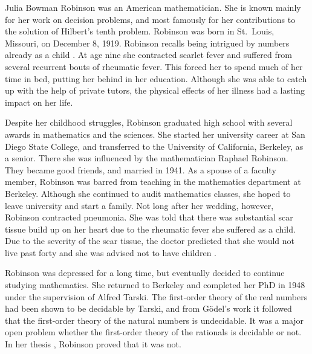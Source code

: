 \documentclass[../../../include/open-logic-section]{subfiles}
\begin{document}


Julia Bowman Robinson was an American mathematician. She is known
mainly for her work on decision problems, and most famously for her
contributions to the solution of Hilbert's tenth problem. Robinson was
born in St.~Louis, Missouri, on December 8, 1919. Robinson recalls
being intrigued by numbers already as a child \cite[4]{Reid1986}.
At age nine she contracted scarlet fever and suffered from several
recurrent bouts of rheumatic fever. This forced her to spend much of
her time in bed, putting her behind in her education.  Although she
was able to catch up with the help of private tutors, the physical
effects of her illness had a lasting impact on her life.

Despite her childhood struggles, Robinson graduated high school with
several awards in mathematics and the sciences. She started her
university career at San Diego State College, and transferred to the
University of California, Berkeley, as a senior. There she was
influenced by the mathematician Raphael Robinson. They became good
friends, and married in 1941. As a spouse of a faculty member,
Robinson was barred from teaching in the mathematics department at
Berkeley. Although she continued to audit mathematics classes, she
hoped to leave university and start a family. Not long after her
wedding, however, Robinson contracted pneumonia. She was told that
there was substantial scar tissue build up on her heart due to the
rheumatic fever she suffered as a child. Due to the severity of the
scar tissue, the doctor predicted that she would not live past forty
and she was advised not to have children \cite[13]{Reid1986}.

Robinson was depressed for a long time, but eventually decided to
continue studying mathematics. She returned to Berkeley and completed
her PhD in 1948 under the supervision of Alfred Tarski. The
first-order theory of the real numbers had been shown to be decidable
by Tarski, and from G\"odel's work it followed that the first-order
theory of the natural numbers is undecidable.  It was a major open
problem whether the first-order theory of the rationals is decidable
or not. In her thesis \cite{Robinson1949}, Robinson proved that
it was not. 
\end{document}
